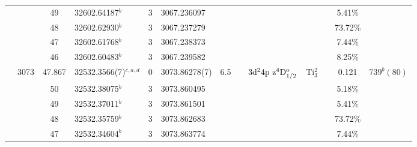 \begin{table*}
\begin{center}
{\begin{tabular}{:l;l;c;l;c;l;c;l;l;c;c;c;c}
\rowstyle{\itshape}               &        & 49        & 32602.64187$^{b}$                & 3 &   3067.236097      &      & $                                        $ & $                                        $ &             &              & 5.41\%    & $     ^{}     $\\
\rowstyle{\itshape}               &        & 48        & 32602.62930$^{b}$                & 3 &   3067.237279      &      & $                                        $ & $                                        $ &             &              & 73.72\%   & $     ^{}     $\\
\rowstyle{\itshape}               &        & 47        & 32602.61768$^{b}$                & 3 &   3067.238373      &      & $                                        $ & $                                        $ &             &              & 7.44\%    & $     ^{}     $\\
\rowstyle{\itshape}               &        & 46        & 32602.60483$^{b}$                & 3 &   3067.239582      &      & $                                        $ & $                                        $ &             &              & 8.25\%    & $     ^{}     $\\
                                  & 3073   & 47.867    & 32532.3566(7)$^{c,a,d}$          & 0 &    3073.86278(7)   &  6.5 & $                                        $ & $3\rm{d}^24\rm{p~z}^4\rm{D}_{1/2}^{\rm o}$ & Ti$^2_{3}$  &              & 0.121     & $  739^{b}(80) $\\
\rowstyle{\itshape}               &        & 50        & 32532.38075$^{b}$                & 3 &   3073.860495      &      & $                                        $ & $                                        $ &             &              & 5.18\%    & $     ^{}     $\\
\rowstyle{\itshape}               &        & 49        & 32532.37011$^{b}$                & 3 &   3073.861501      &      & $                                        $ & $                                        $ &             &              & 5.41\%    & $     ^{}     $\\
\rowstyle{\itshape}               &        & 48        & 32532.35759$^{b}$                & 3 &   3073.862683      &      & $                                        $ & $                                        $ &             &              & 73.72\%   & $     ^{}     $\\
\rowstyle{\itshape}               &        & 47        & 32532.34604$^{b}$                & 3 &   3073.863774      &      & $                                        $ & $                                        $ &             &              & 7.44\%    & $     ^{}     $\\

\end{tabular}}
\end{center}
\end{table*}
